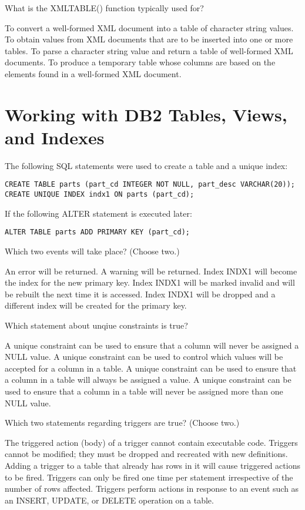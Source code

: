 \documentclass[11pt]{exam}
\begin{document}
\begin{questions}
\question[1]
What is the XMLTABLE() function typically used for?
\begin{choices}
\choice To convert a well-formed XML document into a table of character string values.
\choice To obtain values from XML documents that are to be inserted into one or more tables.
\choice To parse a character string value and return a table of well-formed XML documents.
\choice To produce a temporary table whose columns are based on the elements found in a well-formed XML
document.
\end{choices}

\section{Working with DB2 Tables, Views, and Indexes}
\question[1]
The following SQL statements were used to create a table and a unique index:
\begin{verbatim}
CREATE TABLE parts (part_cd INTEGER NOT NULL, part_desc VARCHAR(20));
CREATE UNIQUE INDEX indx1 ON parts (part_cd);
\end{verbatim}
If the following ALTER statement is executed later:
\begin{verbatim}
ALTER TABLE parts ADD PRIMARY KEY (part_cd);
\end{verbatim}
Which two events will take place? (Choose two.)
\begin{choices}
\choice An error will be returned.
\choice A warning will be returned.
\choice Index INDX1 will become the index for the new primary key.
\choice Index INDX1 will be marked invalid and will be rebuilt the next time it is accessed.
\choice Index INDX1 will be dropped and a different index will be created for the primary key.
\end{choices}

\question[1]
Which statement about unqiue constraints is true?
\begin{choices}
\choice A unique constraint can be used to ensure that a column will never be assigned a NULL value.
\choice A unique constraint can be used to control which values will be accepted for a column in a table.
\choice A unique constraint can be used to ensure that a column in a table will always be assigned a value.
\choice A unique constraint can be used to ensure that a column in a table will never be assigned more than one NULL value.
\end{choices}

\question[1]
Which two statements regarding triggers are true? (Choose two.)
\begin{choices}
\choice The triggered action (body) of a trigger cannot contain executable code.
\choice Triggers cannot be modified; they must be dropped and recreated with new definitions.
\choice Adding a trigger to a table that already has rows in it will cause triggered actions to be fired.
\choice Triggers can only be fired one time per statement irrespective of the number of rows affected.
\choice Triggers perform actions in response to an event such as an INSERT, UPDATE, or DELETE operation
on a table.
\end{choices}


\end{questions}
\end{document}
